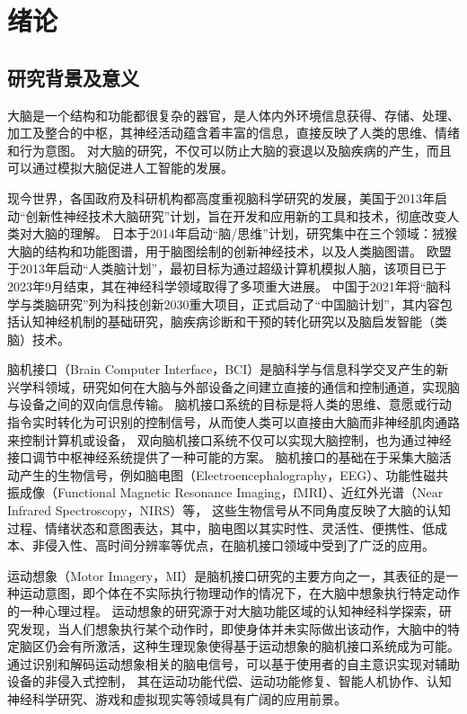 
\chapter{绪论}

\section{研究背景及意义}

大脑是一个结构和功能都很复杂的器官，是人体内外环境信息获得、存储、处理、加工及整合的中枢\cite{LXTX201902004}，其神经活动蕴含着丰富的信息，直接反映了人类的思维、情绪和行为意图。
对大脑的研究，不仅可以防止大脑的衰退以及脑疾病的产生，而且可以通过模拟大脑促进人工智能的发展\cite{KYYX201907013}。

现今世界，各国政府及科研机构都高度重视脑科学研究的发展，美国于2013年启动“创新性神经技术大脑研究”计划，旨在开发和应用新的工具和技术，彻底改变人类对大脑的理解\cite{jorgenson2015brain}。
日本于2014年启动“脑/思维”计划，研究集中在三个领域：狨猴大脑的结构和功能图谱，用于脑图绘制的创新神经技术，以及人类脑图谱\cite{okano2015brain}。
欧盟于2013年启动“人类脑计划”，最初目标为通过超级计算机模拟人脑，该项目已于2023年9月结束，其在神经科学领域取得了多项重大进展\cite{naddaf2023europe}。
中国于2021年将“脑科学与类脑研究”列为科技创新2030重大项目\cite{china2021brain}，正式启动了“中国脑计划”，其内容包括认知神经机制的基础研究，脑疾病诊断和干预的转化研究以及脑启发智能（类脑）技术\cite{POO2016591}。

脑机接口（Brain Computer Interface，BCI）是脑科学与信息科学交叉产生的新兴学科领域，研究如何在大脑与外部设备之间建立直接的通信和控制通道，实现脑与设备之间的双向信息传输\cite{DKJS202106005}。
脑机接口系统的目标是将人类的思维、意愿或行动指令实时转化为可识别的控制信号，从而使人类可以直接由大脑而非神经肌肉通路来控制计算机或设备，
双向脑机接口系统不仅可以实现大脑控制，也为通过神经接口调节中枢神经系统提供了一种可能的方案\cite{he2020brain}。
脑机接口的基础在于采集大脑活动产生的生物信号，例如脑电图（Electroencephalography，EEG）、功能性磁共振成像（Functional Magnetic Resonance Imaging，fMRI）、近红外光谱（Near Infrared Spectroscopy，NIRS）等，
这些生物信号从不同角度反映了大脑的认知过程、情绪状态和意图表达，其中，脑电图以其实时性、灵活性、便携性、低成本、非侵入性、高时间分辨率等优点，在脑机接口领域中受到了广泛的应用。

运动想象（Motor Imagery，MI）是脑机接口研究的主要方向之一，其表征的是一种运动意图，即个体在不实际执行物理动作的情况下，在大脑中想象执行特定动作的一种心理过程。
运动想象的研究源于对大脑功能区域的认知神经科学探索，研究发现，当人们想象执行某个动作时，即使身体并未实际做出该动作，大脑中的特定脑区仍会有所激活，这种生理现象使得基于运动想象的脑机接口系统成为可能。通过识别和解码运动想象相关的脑电信号，可以基于使用者的自主意识实现对辅助设备的非侵入式控制，
其在运动功能代偿、运动功能修复\cite{pichiorri2015brain}、智能人机协作、认知神经科学研究、游戏和虚拟现实等领域具有广阔的应用前景。

